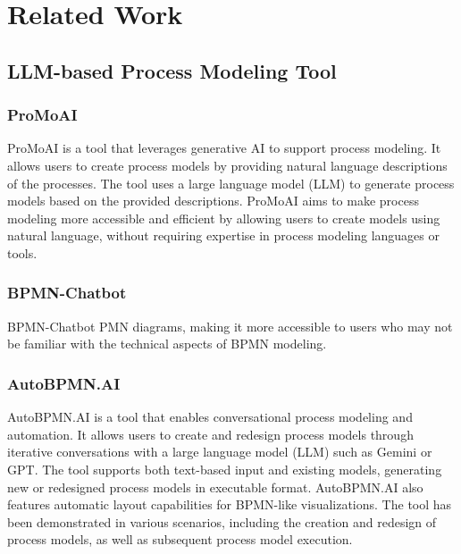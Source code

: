 \chapter{Related Work}
\label{sec:rel}
\section{LLM-based Process Modeling Tool}
\subsection{ProMoAI}
ProMoAI \cite{ProMoAI} is a tool that leverages generative AI to support process modeling. It allows users to create process models by providing natural language descriptions of the processes. The tool uses a large language model (LLM) to generate process models based on the provided descriptions. ProMoAI aims to make process modeling more accessible and efficient by allowing users to create models using natural language, without requiring expertise in process modeling languages or tools.
\subsection{BPMN-Chatbot}
BPMN-Chatbot PMN diagrams, making it more accessible to users who may not be familiar with the technical aspects of BPMN modeling.
\subsection{AutoBPMN.AI}
AutoBPMN.AI \cite{AutoBPMN.AI} is a tool that enables conversational process modeling and automation. It allows users to create and redesign process models through iterative conversations with a large language model (LLM) such as Gemini or GPT. The tool supports both text-based input and existing models, generating new or redesigned process models in executable format. AutoBPMN.AI also features automatic layout capabilities for BPMN-like visualizations. The tool has been demonstrated in various scenarios, including the creation and redesign of process models, as well as subsequent process model execution.

